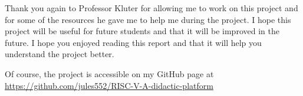 Thank you again to Professor Kluter for allowing me to work on this project and for some of the resources he gave me 
to help me during the project. I hope this project will be useful for future students and that it will be improved in the future.
I hope you enjoyed reading this report and that it will help you understand the project better.

Of course, the project is accessible on my GitHub page at \href{https://github.com/jules552/RISC-V-A-didactic-platform}{https://github.com/jules552/RISC-V-A-didactic-platform}